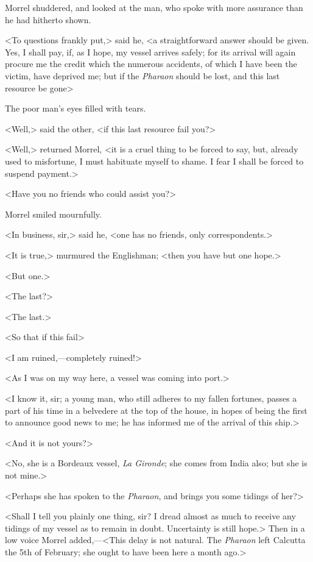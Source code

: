  Morrel shuddered, and looked at the man, who spoke with more assurance than he had hitherto shown. 

 <To questions frankly put,> said he, <a straightforward answer should be given. Yes, I shall pay, if, as I hope, my vessel arrives safely; for its arrival will again procure me the credit which the numerous accidents, of which I have been the victim, have deprived me; but if the \textit{Pharaon} should be lost, and this last resource be gone\longdash> 

 The poor man's eyes filled with tears. 

 <Well,> said the other, <if this last resource fail you?> 

 <Well,> returned Morrel, <it is a cruel thing to be forced to say, but, already used to misfortune, I must habituate myself to shame. I fear I shall be forced to suspend payment.> 

 <Have you no friends who could assist you?> 

 Morrel smiled mournfully. 

 <In business, sir,> said he, <one has no friends, only correspondents.> 

 <It is true,> murmured the Englishman; <then you have but one hope.> 

 <But one.> 

 <The last?> 

 <The last.> 

 <So that if this fail\longdash> 

 <I am ruined,—completely ruined!> 

 <As I was on my way here, a vessel was coming into port.> 

 <I know it, sir; a young man, who still adheres to my fallen fortunes, passes a part of his time in a belvedere at the top of the house, in hopes of being the first to announce good news to me; he has informed me of the arrival of this ship.> 

 <And it is not yours?> 

 <No, she is a Bordeaux vessel, \textit{La Gironde}; she comes from India also; but she is not mine.> 

 <Perhaps she has spoken to the \textit{Pharaon}, and brings you some tidings of her?> 

 <Shall I tell you plainly one thing, sir? I dread almost as much to receive any tidings of my vessel as to remain in doubt. Uncertainty is still hope.> Then in a low voice Morrel added,—<This delay is not natural. The \textit{Pharaon} left Calcutta the 5th of February; she ought to have been here a month ago.> 

